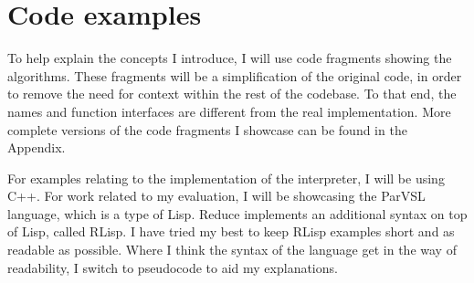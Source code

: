 \section{Code examples}
\label{sec:org2bbfd00}

To help explain the concepts I introduce, I will use code fragments showing the algorithms.
These fragments will be a simplification of the original code, in order to remove the need
for context within the rest of the codebase. To that end, the names and function interfaces
are different from the real implementation. More complete versions of the code fragments
I showcase can be found in the Appendix.

For examples relating to the implementation of the interpreter, I will be using C++.
For work related to my evaluation, I will be showcasing the ParVSL language, which is a type
of Lisp. Reduce implements an additional syntax on top of Lisp, called RLisp.
I have tried my best to keep RLisp examples short and as readable
as possible. Where I think the syntax of the language get in the way of readability, I
switch to pseudocode to aid my explanations.
